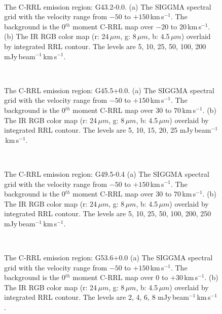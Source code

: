 \documentclass[manuscript]{aastex61}
\newcommand{\kms}{\,km\,s$^{-1}$}
\newcommand{\um}{\mu m}
\begin{document}
\begin{figure}[H]
	\centering
	\\ 
	\caption{The C-RRL emission region: G43.2-0.0.
	(a) The SIGGMA spectral grid with the velocity range from $-50$ to $+150$\kms.
	The background is the 0$^{th}$ moment C-RRL map over $-20$ to $20$\kms.
	(b) The IR RGB color map (r: 24\,$\um$, g: 8\,$\um$, b: 4.5\,$\um$) overlaid by integrated RRL contour.
	The levels are 5, 10, 25, 50, 100, 200 mJy\,beam$^{-1}$\kms.}
	\label{fig_crrl-g432}
\end{figure}
\begin{figure}[H]
	\centering
	\\ 
	\caption{The C-RRL emission region: G45.5+0.0.
	(a) The SIGGMA spectral grid with the velocity range from $-50$ to $+150$\kms.
	The background is the 0$^{th}$ moment C-RRL map over $30$ to $70$\kms.
	(b) The IR RGB color map (r: 24\,$\um$, g: 8\,$\um$, b: 4.5\,$\um$) overlaid by integrated RRL contour.
	The levels are 5, 10, 15, 20, 25 mJy\,beam$^{-1}$\kms.}
	\label{fig_crrl-g455}
\end{figure}
\begin{figure}[H]
	\centering
	\\
	\caption{The C-RRL emission region: G49.5-0.4
	(a) The SIGGMA spectral grid with the velocity range from $-50$ to $+150$\kms.
	The background is the 0$^{th}$ moment C-RRL map over $30$ to $70$\kms.
	(b) The IR RGB color map (r: 24\,$\um$, g: 8\,$\um$, b: 4.5\,$\um$) overlaid by integrated RRL contour.
	The levels are 5, 10, 25, 50, 100, 200, 250 mJy\,beam$^{-1}$\kms.}
	\label{fig_crrl-g494}
\end{figure}
\begin{figure}[H]
	\centering
	\\
	\caption{The C-RRL emission region: G53.6+0.0
	(a) The SIGGMA spectral grid with the velocity range from $-50$ to $+150$\kms.
	The background is the 0$^{th}$ moment C-RRL map over $0$ to $+30$\kms.
	(b) The IR RGB color map (r: 24\,$\um$, g: 8\,$\um$, b: 4.5\,$\um$) overlaid by integrated RRL contour.
	The levels are 2, 4, 6, 8 mJy\,beam$^{-1}$\kms.}
	\label{fig_crrl-g536}
\end{figure}
\end{document}
